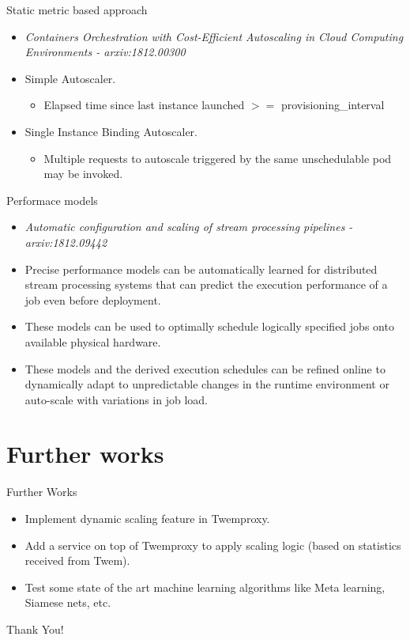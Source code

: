 \documentclass{beamer}
\begin{document}
\begin{frame}{Static metric based approach}
    \begin{itemize}
        \pause\item \textit{Containers Orchestration with Cost-Efficient Autoscaling in Cloud Computing Environments - arxiv:1812.00300}
        \pause\item Simple Autoscaler.
            \begin{itemize}
                \pause\item Elapsed time since last instance launched $>=$ provisioning\_interval
            \end{itemize}
        \pause\item Single Instance Binding Autoscaler.
            \begin{itemize}
                \pause\item Multiple requests to autoscale triggered by the same unschedulable pod may be invoked.
            \end{itemize}
    \end{itemize}
\end{frame}

\begin{frame}{Performace models}
    \begin{itemize}
        \pause\item \textit{Automatic configuration and scaling of stream processing pipelines - arxiv:1812.09442}
        \pause\item Precise performance models can be automatically
learned for distributed stream processing systems
that can predict the execution performance of a job
even before deployment.
    \pause\item These models can be
used to optimally schedule logically specified jobs onto
available physical hardware.

    \pause\item These models and
the derived execution schedules can be refined online to
dynamically adapt to unpredictable changes in the runtime
environment or auto-scale with variations in job
load.
    \end{itemize}
\end{frame}


\section{Further works}
\begin{frame}{Further Works}
    \begin{itemize}
        \pause\item Implement dynamic scaling feature in Twemproxy.
        \pause\item Add a service on top of Twemproxy to apply scaling logic (based on statistics received from Twem).

        \pause\item Test some state of the art machine learning algorithms like Meta learning, Siamese nets, etc.
    \end{itemize}
\end{frame}

\begin{frame}
    \begin{center}
    \Huge{Thank You!}
    \end{center}
    \end{frame}
\end{document}
